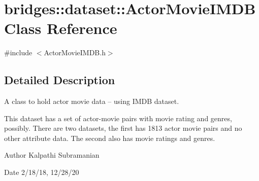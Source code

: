 \hypertarget{classbridges_1_1dataset_1_1_actor_movie_i_m_d_b}{}\section{bridges\+:\+:dataset\+:\+:Actor\+Movie\+I\+M\+DB Class Reference}
\label{classbridges_1_1dataset_1_1_actor_movie_i_m_d_b}


{\ttfamily \#include $<$Actor\+Movie\+I\+M\+D\+B.\+h$>$}



\subsection{Detailed Description}
A class to hold actor movie data -- using I\+M\+DB dataset. 

This dataset has a set of actor-\/movie pairs with movie rating and genres, possibly. There are two datasets, the first has 1813 actor movie pairs and no other attribute data. The second also has movie ratings and genres.

\begin{DoxyAuthor}{Author}
Kalpathi Subramanian 
\end{DoxyAuthor}
\begin{DoxyDate}{Date}
2/18/18, 12/28/20 
\end{DoxyDate}
